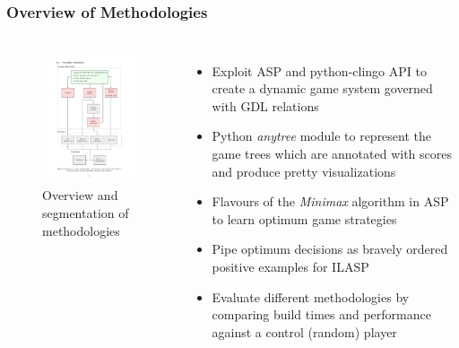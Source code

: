 \documentclass{beamer}
\begin{document}
\subsection{}
\begin{framefont}{\footnotesize}
  \begin{frame}
    \frametitle{Overview of Methodologies}
    \begin{columns}
      \vspace{-20pt}
      \begin{figure}
        \centering
        \includegraphics[trim={3cm 4cm 3cm 3.5cm},clip,width=4.8cm]{workflow.pdf}
        \caption{Overview and segmentation of methodologies}
      \end{figure}
      \vspace{-20pt}
      \begin{itemize}[<+->]
        \setlength\itemsep{1.2em}
      \item Exploit ASP and python-clingo API to create a dynamic game system governed with GDL relations
      \item Python \textit{anytree} module to represent the game trees which are annotated with scores and produce pretty visualizations
      \item Flavours of the \textit{Minimax} algorithm in ASP to learn optimum game strategies
      \item Pipe optimum decisions as bravely ordered positive examples for ILASP
      \item Evaluate different methodologies by comparing build times and performance against a control (random) player
      \end{itemize}
    \end{columns}
  \end{frame}
\end{framefont}
\end{document}
